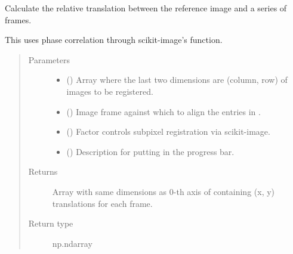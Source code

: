 \documentclass[letterpaper,10pt,english]{sphinxmanual}
\begin{document}

\begin{fulllineitems}
\label{\detokenize{xanespy:xanespy.xanes_math.register_correlations}}
Calculate the relative translation between the reference image and
a series of frames.

This uses phase correlation through scikit-image’s
 function.
\begin{quote}\begin{description}
\item[{Parameters}] \leavevmode\begin{itemize}
\item {} 
 () \textendash{} Array where the last two dimensions are (column, row) of images
to be registered.

\item {} 
 () \textendash{} Image frame against which to align the entries in .

\item {} 
 (\sphinxstyleliteralemphasis{, }) \textendash{} Factor controls subpixel registration via scikit-image.

\item {} 
 (\sphinxstyleliteralemphasis{, }) \textendash{} Description for putting in the progress bar.

\end{itemize}

\item[{Returns}] \leavevmode
{} \textendash{} Array with same dimensions as 0-th axis of  containing
(x, y) translations for each frame.

\item[{Return type}] \leavevmode
np.ndarray

\end{description}\end{quote}

\end{fulllineitems}
\end{document}
